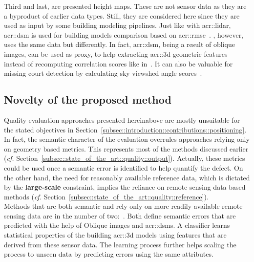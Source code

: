             Third and last, are presented height maps.
            These are not sensor data as they are a byproduct of earlier data types.
            Still, they are considered here since they are used as input by some building modeling pipelines.
            Just like with \gls{acr::lidar}, \gls{acr::dsm} is used for building models comparison based on \gls{acr::rmse}~\parencite{zeng2018neural}.
            \textcite{michelin2013quality}, however, uses the same data but differently.
            In fact, \gls{acr::dsm}, being a result of oblique images, can be used as proxy, to help extracting \gls{acr::3d} geometric features instead of recomputing correlation scores like in~\parencite{boudet2006supervised}.
            It can also be valuable for missing court detection by calculating sky viewshed angle scores~\parencite{michelin2013quality}.

    \subsection{Novelty of the proposed method}
        \label{subsec::state_of_the_art::quality::novelty}
        Quality evaluation approaches presented hereinabove are mostly unsuitable for the stated objectives in Section~\ref{subsec::introduction::contributions::positioning}.\\

        In fact, the semantic character of the evaluation overrules approaches relying only on geometry based metrics.
        This represents most of the methods discussed earlier (\textit{cf.} Section~\ref{subsec::state_of_the_art::quality::output}).
        Actually, these metrics could be used once a semantic error is identified to help quantify the defect.
        On the other hand, the need for reasonably available reference data, which is dictated by the \textbf{large-scale} constraint, implies the reliance on remote sensing data based methods (\textit{cf.} Section~\ref{subsec::state_of_the_art::quality::reference}).\\

        Methods that are both semantic and rely only on more readily available remote sensing data are in the number of two:~\parencite{boudet2006supervised,michelin2013quality}.
        Both define semantic errors that are predicted with the help of Oblique images and \glspl{acr::dsm}.
        A classifier learns statistical properties of the building \gls{acr::3d} models using features that are derived from these sensor data.
        The learning process further helps scaling the process to unseen data by predicting errors using the same attributes.\\

